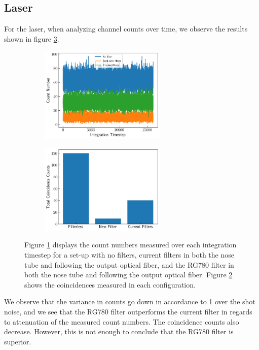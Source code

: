 \documentclass[letterpaper, 11 pt]{article}
\begin{document}
\subsection{Laser}
For the laser, when analyzing channel counts over time, we observe the results
shown in figure \ref{fig:filter_run}.
\begin{figure}[H]%
    \centering
    \begin{subfigure}{.4\textwidth}
    \includegraphics[width=6cm]{filter_ch1_laser.png}
    \caption{ }
    \label{fig:lch1}
    \end{subfigure}
    \begin{subfigure}{.4\textwidth}
    \includegraphics[width = 6cm]{filter_cc_laser.png}
    \caption{ }
    \label{fig:lcc}
    \end{subfigure}
    \caption{Figure \ref{fig:lch1} displays the count numbers measured over each
    integration timestep for a set-up with no filters, current filters in both the
    nose tube and following the output optical fiber, and the RG780 filter in
    both the nose tube and following the output optical fiber. Figure
    \ref{fig:lcc} shows the coincidences measured in each configuration.}
    \label{fig:filter_run}
\end{figure}
We observe that the variance in counts go down in accordance to 1 over the shot
noise, and we see that the RG780 filter outperforms the current filter in
regards to attenuation of the measured count numbers. The coincidence counts
also decrease. However, this is not enough to conclude that the RG780 filter is superior.
\end{document}
